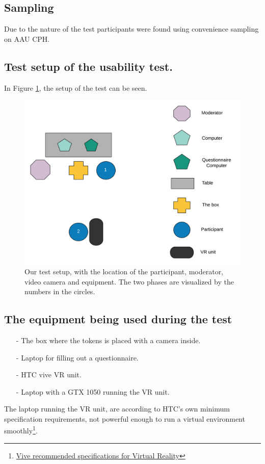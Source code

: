 \subsection{Sampling}
Due to the nature of the test participants were found using convenience sampling on AAU CPH.
\subsection{Test setup of the usability test.}
In Figure \ref{fig:test1}, the setup of the test can be seen.
\begin{figure}[H]
	\centering
	\includegraphics[width=1\linewidth]{figure/Evaluation/Test1.png}
	\caption{Our test setup, with the location of the participant, moderator, video camera and equipment. The two phases are visualized by the numbers in the circles.}
	\label{fig:test1}
\end{figure}

\subsection*{The equipment being used during the test}
\begin{itemize}
	\item[-] The box where the tokens is placed with a camera inside.
	\item[-] Laptop for filling out a questionnaire.
	\item[-] HTC vive VR unit.
	\item[-] Laptop with a GTX 1050 running the VR unit.
\end{itemize}
The laptop running the VR unit, are according to HTC's own minimum specification requirements, not powerful enough to run a virtual environment smoothly\footnote{\href{https://www.vive.com/us/ready/}{\color{blue}Vive recommended specifications for Virtual Reality}}.
